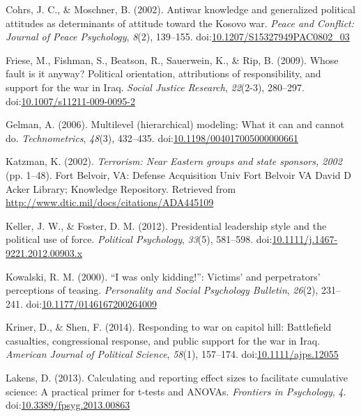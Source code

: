 \documentclass[english,,man]{apa6}
\begin{document}
\leavevmode\hypertarget{ref-Cohrs2002}{}%
Cohrs, J. C., \& Moschner, B. (2002). Antiwar knowledge and generalized political attitudes as determinants of attitude toward the Kosovo war. \emph{Peace and Conflict: Journal of Peace Psychology}, \emph{8}(2), 139--155. doi:\href{https://doi.org/10.1207/S15327949PAC0802_03}{10.1207/S15327949PAC0802\_03}

\leavevmode\hypertarget{ref-Friese2009}{}%
Friese, M., Fishman, S., Beatson, R., Sauerwein, K., \& Rip, B. (2009). Whose fault is it anyway? Political orientation, attributions of responsibility, and support for the war in Iraq. \emph{Social Justice Research}, \emph{22}(2-3), 280--297. doi:\href{https://doi.org/10.1007/s11211-009-0095-2}{10.1007/s11211-009-0095-2}

\leavevmode\hypertarget{ref-Gelman2006}{}%
Gelman, A. (2006). Multilevel (hierarchical) modeling: What it can and cannot do. \emph{Technometrics}, \emph{48}(3), 432--435. doi:\href{https://doi.org/10.1198/004017005000000661}{10.1198/004017005000000661}

\leavevmode\hypertarget{ref-Katzman2002}{}%
Katzman, K. (2002). \emph{Terrorism: Near Eastern groups and state sponsors, 2002} (pp. 1--48). Fort Belvoir, VA: Defense Acquisition Univ Fort Belvoir VA David D Acker Library; Knowledge Repository. Retrieved from \url{http://www.dtic.mil/docs/citations/ADA445109}

\leavevmode\hypertarget{ref-Keller2012}{}%
Keller, J. W., \& Foster, D. M. (2012). Presidential leadership style and the political use of force. \emph{Political Psychology}, \emph{33}(5), 581--598. doi:\href{https://doi.org/10.1111/j.1467-9221.2012.00903.x}{10.1111/j.1467-9221.2012.00903.x}

\leavevmode\hypertarget{ref-Kowalski2000}{}%
Kowalski, R. M. (2000). ``I was only kidding!'': Victims' and perpetrators' perceptions of teasing. \emph{Personality and Social Psychology Bulletin}, \emph{26}(2), 231--241. doi:\href{https://doi.org/10.1177/0146167200264009}{10.1177/0146167200264009}

\leavevmode\hypertarget{ref-Kriner2014}{}%
Kriner, D., \& Shen, F. (2014). Responding to war on capitol hill: Battlefield casualties, congressional response, and public support for the war in Iraq. \emph{American Journal of Political Science}, \emph{58}(1), 157--174. doi:\href{https://doi.org/10.1111/ajps.12055}{10.1111/ajps.12055}

\leavevmode\hypertarget{ref-Lakens2013}{}%
Lakens, D. (2013). Calculating and reporting effect sizes to facilitate cumulative science: A practical primer for t-tests and ANOVAs. \emph{Frontiers in Psychology}, \emph{4}. doi:\href{https://doi.org/10.3389/fpsyg.2013.00863}{10.3389/fpsyg.2013.00863}
\end{document}
